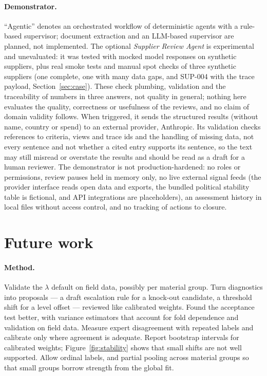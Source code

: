 \documentclass[10pt,twocolumn,a4paper]{article}
\begin{document}
\paragraph{Demonstrator.} ``Agentic'' denotes an orchestrated workflow of deterministic
agents with a rule-based supervisor; document extraction and an LLM-based supervisor are
planned, not implemented. The optional \emph{Supplier Review Agent} is experimental and
unevaluated: it was tested with mocked model responses on synthetic suppliers, plus real
smoke tests and manual spot checks of three synthetic suppliers (one complete, one with many data
gaps, and SUP-004 with the trace payload, Section~\ref{sec:case}). These check plumbing,
validation and the traceability of numbers in three answers, not
quality in general; nothing here evaluates the quality, correctness or usefulness
of the reviews, and no claim of domain validity follows. When triggered, it sends the
structured results (without name, country or spend) to an external provider, Anthropic.
Its validation checks references to criteria, views and trace ids and the handling of missing
data, not every sentence and not whether a cited entry supports its sentence, so the text may still misread or overstate the results and should be
read as a draft for a human reviewer. The demonstrator is not production-hardened: no roles or permissions, review
pauses held in memory only, no live external signal feeds (the provider interface reads
open data and exports, the bundled political stability table is fictional, and API
integrations are placeholders), an assessment history in local files without access control, and no
tracking of actions to closure.

\section{Future work}
\label{sec:future}

\paragraph{Method.} Validate the $\lambda$ default on field data, possibly per material
group. Turn diagnostics into proposals --- a draft escalation rule for a knock-out
candidate, a threshold shift for a level offset --- reviewed like calibrated weights.
Found the acceptance test better, with variance estimators that account for fold
dependence \cite{nadeau2003} and validation on field data. Measure expert disagreement
with repeated labels and calibrate only where agreement is adequate. Report bootstrap
intervals for calibrated weights; Figure~\ref{fig:stability} shows that small shifts are
not well supported. Allow ordinal labels, and partial pooling across material groups so
that small groups borrow strength from the global fit.
\end{document}

